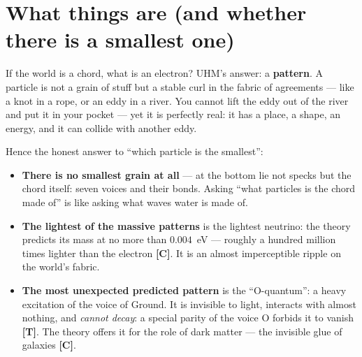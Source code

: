 \documentclass[11pt,letterpaper]{article}
\newcommand{\stT}{\textbf{[T]}\xspace}
\newcommand{\stC}{\textbf{[C]}\xspace}
\begin{document}
\section{What things are (and whether there is a smallest one)}
\label{sec:things}

If the world is a chord, what is an electron? UHM's answer: a
\textbf{pattern}. A particle is not a grain of stuff but a stable
curl in the fabric of agreements --- like a knot in a rope, or an
eddy in a river. You cannot lift the eddy out of the river and put it
in your pocket --- yet it is perfectly real: it has a place, a shape,
an energy, and it can collide with another eddy.

Hence the honest answer to ``which particle is the smallest'':

\begin{itemize}[leftmargin=1.6em]
  \item \textbf{There is no smallest grain at all} --- at the bottom
        lie not specks but the chord itself: seven voices and their
        bonds. Asking ``what particles is the chord made of'' is like
        asking what waves water is made of.
  \item \textbf{The lightest of the massive patterns} is the lightest
        neutrino: the theory predicts its mass at no more than
        $0.004$~eV --- roughly a hundred million times lighter than
        the electron \stC. It is an almost imperceptible ripple on the
        world's fabric.
  \item \textbf{The most unexpected predicted pattern} is the
        ``O-quantum'': a heavy excitation of the voice of Ground. It
        is invisible to light, interacts with almost nothing, and
        \emph{cannot decay}: a special parity of the voice O forbids
        it to vanish \stT. The theory offers it for the role of dark
        matter --- the invisible glue of galaxies \stC.
\end{itemize}
\end{document}
